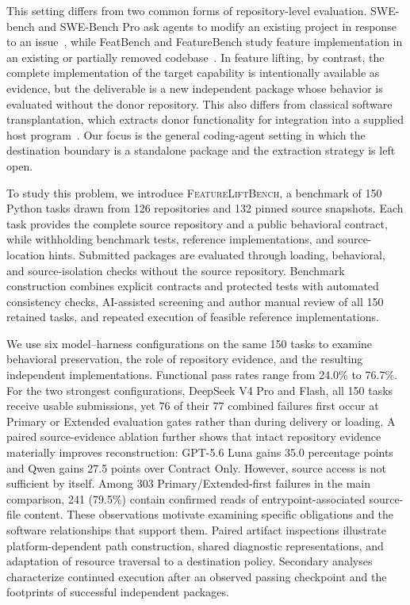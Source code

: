 \documentclass[acmsmall,screen,review,anonymous]{acmart}
\newcommand{\flb}{\textsc{FeatureLiftBench}\xspace}
\begin{document}
This setting differs from two common forms of repository-level evaluation.
SWE-bench and SWE-Bench Pro ask agents to modify an existing project in response
to an issue~\cite{jimenez2024swebench,deng2025swebenchpro}, while FeatBench and
FeatureBench study feature implementation in an existing or partially removed
codebase~\cite{chen2026featbench,zhou2026featurebench}. In feature lifting, by
contrast, the complete implementation of the target capability is intentionally
available as evidence, but the deliverable is a new independent package whose
behavior is evaluated without the donor repository. This also differs from
classical software transplantation, which extracts donor functionality for
integration into a supplied host program~\cite{barr2015transplantation}. Our
focus is the general coding-agent setting in which the destination boundary is a
standalone package and the extraction strategy is left open.

To study this problem, we introduce \flb, a benchmark of 150 Python tasks drawn
from 126 repositories and 132 pinned source snapshots. Each task provides the
complete source repository and a public behavioral contract, while withholding
benchmark tests, reference implementations, and source-location hints. Submitted
packages are evaluated through loading, behavioral, and source-isolation checks
without the source repository. Benchmark construction combines explicit
contracts and protected tests with automated consistency checks, AI-assisted
screening and author manual review of all 150 retained tasks, and repeated
execution of feasible reference implementations.

We use six model--harness configurations on the same 150 tasks to examine
behavioral preservation, the role of repository evidence, and the resulting
independent implementations. Functional pass rates range from 24.0\% to 76.7\%.
For the two strongest configurations, DeepSeek V4 Pro and Flash, all
150 tasks receive usable submissions, yet 76 of their 77 combined failures first
occur at Primary or Extended evaluation gates rather than during delivery or loading. A paired
source-evidence ablation further shows that intact repository evidence materially
improves reconstruction: GPT-5.6 Luna gains 35.0 percentage points and Qwen gains
27.5 points over Contract Only. However, source access is not sufficient by
itself. Among 303 Primary/Extended-first failures in the main comparison, 241 (79.5\%)
contain confirmed reads of entrypoint-associated source-file content. These observations motivate examining specific obligations and
the software relationships that support them. Paired artifact inspections
illustrate platform-dependent path construction, shared diagnostic
representations, and adaptation of resource traversal to a destination policy.
Secondary analyses characterize continued execution after an observed passing
checkpoint and the footprints of successful independent packages.
\end{document}
